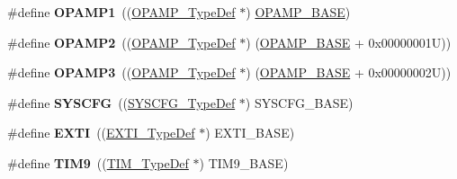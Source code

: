 \begin{DoxyCompactItemize}
\item 
\hypertarget{group___peripheral__declaration_gaf0025add8d004b4f4bf6eaeedd55c488}{\#define {\bfseries O\-P\-A\-M\-P1}~((\hyperlink{struct_o_p_a_m_p___type_def}{O\-P\-A\-M\-P\-\_\-\-Type\-Def} $\ast$) \hyperlink{group___peripheral__memory__map_ga6e9722d15c7ed794f0eca9682f64c03c}{O\-P\-A\-M\-P\-\_\-\-B\-A\-S\-E})}\label{group___peripheral__declaration_gaf0025add8d004b4f4bf6eaeedd55c488}

\item 
\hypertarget{group___peripheral__declaration_gabc11c296d6d15ca861b6378bc056848e}{\#define {\bfseries O\-P\-A\-M\-P2}~((\hyperlink{struct_o_p_a_m_p___type_def}{O\-P\-A\-M\-P\-\_\-\-Type\-Def} $\ast$) (\hyperlink{group___peripheral__memory__map_ga6e9722d15c7ed794f0eca9682f64c03c}{O\-P\-A\-M\-P\-\_\-\-B\-A\-S\-E} + 0x00000001\-U))}\label{group___peripheral__declaration_gabc11c296d6d15ca861b6378bc056848e}

\item 
\hypertarget{group___peripheral__declaration_ga50369700b1093ec17ad8d1835223b1e0}{\#define {\bfseries O\-P\-A\-M\-P3}~((\hyperlink{struct_o_p_a_m_p___type_def}{O\-P\-A\-M\-P\-\_\-\-Type\-Def} $\ast$) (\hyperlink{group___peripheral__memory__map_ga6e9722d15c7ed794f0eca9682f64c03c}{O\-P\-A\-M\-P\-\_\-\-B\-A\-S\-E} + 0x00000002\-U))}\label{group___peripheral__declaration_ga50369700b1093ec17ad8d1835223b1e0}

\item 
\hypertarget{group___peripheral__declaration_ga3c833fe1c486cb62250ccbca32899cb8}{\#define {\bfseries S\-Y\-S\-C\-F\-G}~((\hyperlink{struct_s_y_s_c_f_g___type_def}{S\-Y\-S\-C\-F\-G\-\_\-\-Type\-Def} $\ast$) S\-Y\-S\-C\-F\-G\-\_\-\-B\-A\-S\-E)}\label{group___peripheral__declaration_ga3c833fe1c486cb62250ccbca32899cb8}

\item 
\hypertarget{group___peripheral__declaration_ga9189e770cd9b63dadd36683eb9843cac}{\#define {\bfseries E\-X\-T\-I}~((\hyperlink{struct_e_x_t_i___type_def}{E\-X\-T\-I\-\_\-\-Type\-Def} $\ast$) E\-X\-T\-I\-\_\-\-B\-A\-S\-E)}\label{group___peripheral__declaration_ga9189e770cd9b63dadd36683eb9843cac}

\item 
\hypertarget{group___peripheral__declaration_gaf52b4b4c36110a0addfa98059f54a50e}{\#define {\bfseries T\-I\-M9}~((\hyperlink{struct_t_i_m___type_def}{T\-I\-M\-\_\-\-Type\-Def} $\ast$) T\-I\-M9\-\_\-\-B\-A\-S\-E)}\label{group___peripheral__declaration_gaf52b4b4c36110a0addfa98059f54a50e}


\end{DoxyCompactItemize}
